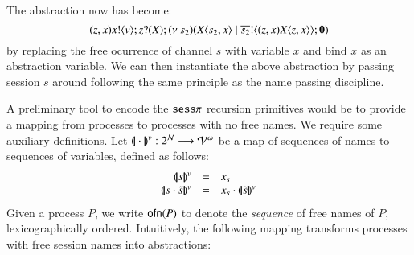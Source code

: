 The abstraction now has become:
$$(z,x) x ! \langle v \rangle ; z ? (X) ; (\nu\ s_2)(X\langle s_2,x \rangle \;|\; \overline{s_2} ! \langle (z,x) X\langle z,x \rangle  \rangle ; \mathbf{0})$$
by replacing the free ocurrence of channel $s$ with variable $x$ and
bind $x$ as an abstraction variable. We can then instantiate
the above abstraction by passing session $s$ around following the same
principle as the name passing discipline.

A preliminary tool to encode the $\mathtt{sess}\pi$ recursion primitives would be to
provide a mapping from processes to processes with no free names.
We require some auxiliary definitions. 
Let $(\!|\!|\cdot|\!|\!)^v: 2^{\mathcal{N}} \longrightarrow \mathcal{V}^\omega$
be a map of sequences of names to sequences of variables, defined as follows:
\[
	\begin{array}{rcl}
		\vmap{s} & = & x_s \\
		\vmap{s \cat \tilde{s}} &=& x_s \cat \vmap{\tilde{s}}\\
	\end{array}
\]
Given a process $P$, we write $\mathsf{ofn}(P)$ to denote the \emph{sequence} of free names of $P$, lexicographically ordered.
Intuitively, the following mapping transforms processes with free session names into abstractions:
